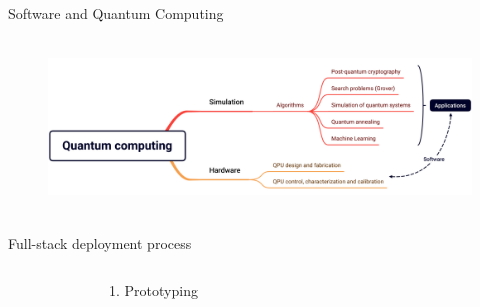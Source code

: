 \documentclass[aspectratio=169, 10pt, xcolor={svgnames}, hyperref={linkcolor=black}]{beamer}
\begin{document}
\begin{frame}{Software and Quantum Computing}
   \begin{figure}
     \includegraphics[height=4.7cm]{figures/q1.png}
   \end{figure}
 \end{frame}

\begin{frame}{Full-stack deployment process}
   \begin{columns}
     \column{9.2cm}
     \begin{figure}
     \end{figure}
   \column{6cm}
   \begin{block}{1. Prototyping}

\end{block}
\end{columns}
\end{frame}
\end{document}
